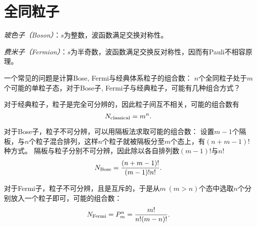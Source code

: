 \section{全同粒子}

\emph{玻色子（Boson）}：$s$为整数，波函数满足交换对称性。

\emph{费米子（Fermion）}：$s$为半奇数，波函数满足交换反对称性，因而有Pauli不相容原理。

一个常见的问题是计算Bose, Fermi与经典体系粒子的组合数：
$n$个全同粒子处于$m$个可能的单粒子态，对于Bose子, Fermi子与经典粒子，可能有几种组合方式？

对于经典粒子，粒子是完全可分辨的，因此粒子间互不相关，可能的组合数有
\begin{equation}
    N_{\rm{classical}} = m^n.
\end{equation}

对于Bose子，粒子不可分辨，可以用隔板法求取可能的组合数：
设置$m-1$个隔板，与$n$个粒子混合排列，这样$n$个粒子就被隔板分至$m$个态上，有$(n+m-1)!$种方式。
隔板与粒子分别不可分辨，因此除以各自排列数$(m-1)!$与$n!$
\begin{equation}
    N_{\rm{Bose}} = \frac{(n+m-1)!}{(m-1)! n!}.
\end{equation}

对于Fermi子，粒子不可分辨，且是互斥的，于是从$m\ (m>n)$个态中选取$n$个分别放入一个粒子即可，可能的组合数：
\begin{equation}
    N_{\rm{Fermi}} = P_m^n = \frac{m!}{n!(m-n)!}.
\end{equation}